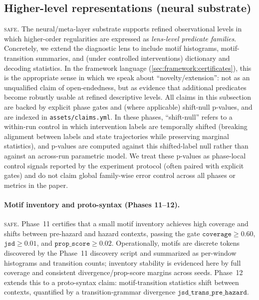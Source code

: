 \documentclass[11pt]{article}
\newcommand{\SAFE}{\textsc{safe}}
\begin{document}
\subsection{Higher-level representations (neural substrate)}\label{sec:results:repr}
\SAFE. The neural/meta-layer substrate supports refined observational levels in which higher-order regularities are expressed as \emph{lens-level predicate families}. Concretely, we extend the diagnostic lens to include motif histograms, motif-transition summaries, and (under controlled interventions) dictionary and decoding statistics. In the framework language (\cref{sec:framework:certificates}), this is the appropriate sense in which we speak about ``novelty/extension'': not as an unqualified claim of open-endedness, but as evidence that additional predicates become robustly usable at refined descriptive levels. All claims in this subsection are backed by explicit phase gates and (where applicable) shift-null p-values, and are indexed in \texttt{assets/claims.yml}. In these phases, ``shift-null'' refers to a within-run control in which intervention labels are temporally shifted (breaking alignment between labels and state trajectories while preserving marginal statistics), and p-values are computed against this shifted-label null rather than against an across-run parametric model. We treat these p-values as phase-local control signals reported by the experiment protocol (often paired with explicit gates) and do not claim global family-wise error control across all phases or metrics in the paper.

\paragraph{Motif inventory and proto-syntax (Phases 11--12).}
\SAFE. Phase~11 certifies that a small motif inventory achieves high coverage and shifts between pre-hazard and hazard contexts, passing the gate $\texttt{coverage}\ge 0.60$, $\texttt{jsd}\ge 0.01$, and $\texttt{prop\_score}\ge 0.02$. Operationally, motifs are discrete tokens discovered by the Phase~11 discovery script and summarized as per-window histograms and transition counts; inventory stability is evidenced here by full coverage and consistent divergence/prop-score margins across seeds. Phase~12 extends this to a proto-syntax claim: motif-transition statistics shift between contexts, quantified by a transition-grammar divergence $\texttt{jsd\_trans\_pre\_hazard}$.
\end{document}
